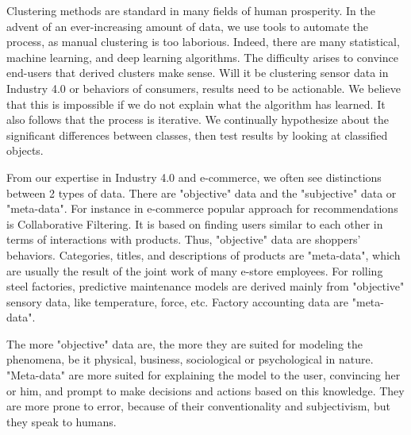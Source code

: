 \documentclass[
 twocolumn,
]{ceurart}
\begin{document}
Clustering methods are standard in many fields of human prosperity.
In the advent of an ever-increasing amount of data, we use tools to automate the process, as manual clustering is too laborious.
Indeed, there are many statistical, machine learning, and deep learning algorithms.
The difficulty arises to convince end-users that derived clusters make sense.
Will it be clustering sensor data in Industry 4.0 or behaviors of consumers, results need to be actionable.
We believe that this is impossible if we do not explain what the algorithm has learned. %
It also follows that the process is iterative.
We continually hypothesize about the significant differences between classes, then test results by looking at classified objects.

From our expertise in Industry 4.0 and e-commerce, we often see distinctions between 2 types of data.
There are "objective" data and the "subjective" data or "meta-data".
For instance in e-commerce popular approach for recommendations is Collaborative Filtering.
It is based on finding users similar to each other in terms of interactions with products.
Thus, "objective" data are shoppers' behaviors.
Categories, titles, and descriptions of products are "meta-data", which are usually the result of the joint work of many e-store employees.
For rolling steel factories, predictive maintenance models are derived mainly from "objective" sensory data, like temperature, force, etc.
Factory accounting data are "meta-data".

The more "objective" data are, the more they are suited for modeling the phenomena, be it physical, business, sociological or psychological in nature.
"Meta-data" are more suited for explaining the model to the user, convincing her or him, and prompt to make decisions and actions based on this knowledge.
They are more prone to error, because of their conventionality and subjectivism, but they speak to humans.
\end{document}
